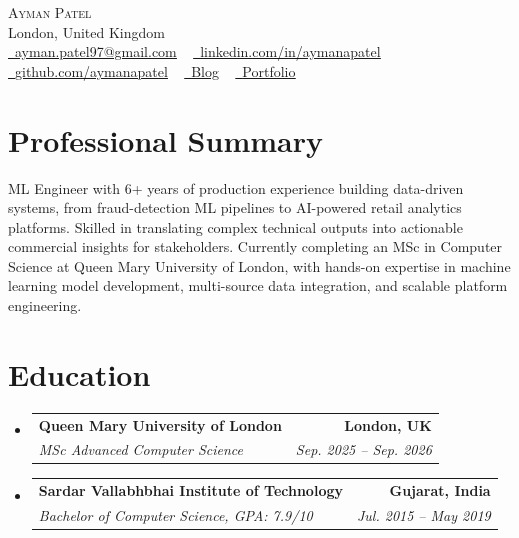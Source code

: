 \documentclass[letterpaper,11pt]{article}
\makeatletter
\newcommand{\resumeSubheading}[4]{
  \vspace{-3pt}\item
    \begin{tabular*}{1.0\textwidth}[t]{l@{\extracolsep{\fill}}r}
      \textbf{#1} & \textbf{\small #2} \\
      \textit{\small#3} & \textit{\small #4} \\
    \end{tabular*}\vspace{-7pt}
}
\newcommand{\resumeSubHeadingListStart}{\begin{itemize}[leftmargin=0.0in, label={}]}
\newcommand{\resumeSubHeadingListEnd}{\end{itemize}}
\makeatother
\begin{document}
    \begin{center}
        {\Huge\scshape Ayman Patel}
        \\ London, United Kingdom\\
        \small
        \textcolor{black}{\href{mailto:ayman.patel97@gmail.com}{\raisebox{-0.2\height}\faEnvelope\  \underline{ayman.patel97@gmail.com}}} ~
        \textcolor{black}{\href{https://linkedin.com/in/aymanapatel}{\raisebox{-0.2\height}\faLinkedin\ \underline{linkedin.com/in/aymanapatel}}}  ~
        \textcolor{black}{\href{https://github.com/aymanapatel}{\raisebox{-0.2\height}\faGithub\ \underline{github.com/aymanapatel}}} ~
        \textcolor{black}{\href{https://aymanace2049.hashnode.dev}{\raisebox{-0.2\height}\faLink\ \underline{Blog}}} ~
        \textcolor{black}{\href{https://patelofthought.com/me}{\raisebox{-0.2\height}\faGlobe\ \underline{Portfolio}}}
    \end{center}

\section{Professional Summary}
\small{
ML Engineer with 6+ years of production experience building data-driven systems, from fraud-detection ML pipelines to AI-powered retail analytics platforms. Skilled in translating complex technical outputs into actionable commercial insights for stakeholders. Currently completing an MSc in Computer Science at Queen Mary University of London, with hands-on expertise in machine learning model development, multi-source data integration, and scalable platform engineering.
}
\vspace{2pt}



\section{Education}
  \resumeSubHeadingListStart
    \resumeSubheading
      {Queen Mary University of London}{London, UK}
      {MSc Advanced Computer Science}{Sep. 2025 -- Sep. 2026}
    \resumeSubheading
      {Sardar Vallabhbhai Institute of Technology}{Gujarat, India}
      {Bachelor of Computer Science, GPA: 7.9/10}{Jul. 2015 -- May 2019}
  \resumeSubHeadingListEnd
\end{document}
